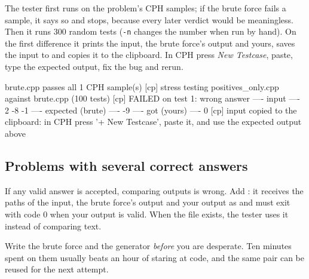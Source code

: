 The tester first runs  on the problem's CPH samples; if the brute force fails a sample, it says so
and stops, because every later verdict would be meaningless. Then it runs 300 random tests (\texttt{-n} changes the
number when run by hand). On the first difference it prints the input, the brute force's output and yours, saves
the input to  and copies it to the clipboard. In CPH press \emph{New Testcase}, paste, type the
expected output, fix the bug and rerun.

\begin{shell}
[cp] brute.cpp passes all 1 CPH sample(s)
[cp] stress testing positives_only.cpp against brute.cpp (100 tests)
[cp] FAILED on test 1: wrong answer
---- input ----
2
-8 -1
---- expected (brute) ----
-9
---- got (yours) ----
0
[cp] input copied to the clipboard: in CPH press '+ New Testcase', paste it, and use the expected output above
\end{shell}

\subsection{Problems with several correct answers}
If any valid answer is accepted, comparing outputs is wrong. Add : it receives the paths of
the input, the brute force's output and your output as  and must exit with code 0 when your output
is valid. When the file exists, the tester uses it instead of comparing text.

\begin{tip}
Write the brute force and the generator \emph{before} you are desperate. Ten minutes spent on them usually beats an
hour of staring at code, and the same pair can be reused for the next attempt.
\end{tip}
